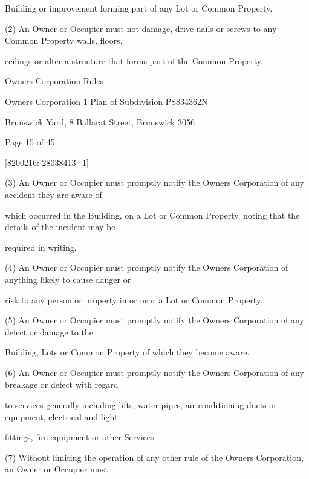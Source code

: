 \documentclass{article}
\begin{document}
{\fontsize{10.02}{1}Building or improvement forming part of any Lot or Common Property. }

{\fontsize{9.962}{1}(2) An Owner or Occupier must not damage, drive nails or screws to any Common Property walls, floors, }

{\fontsize{10.02}{1}ceilings or alter a structure that forms part of the Common Property. }


\newpage





{\fontsize{9}{1}Owners Corporation Rules }

{\fontsize{9}{1}Owners Corporation 1 Plan of Subdivision PS834362N }

{\fontsize{9}{1}Brunswick Yard, 8 Ballarat Street, Brunswick 3056 }


{\fontsize{9}{1}Page 15  of 45 }



{\fontsize{7.02}{1}[8200216: 28038413\_1] }

{\fontsize{9.962}{1}(3) An Owner or Occupier must promptly notify the Owners Corporation of any accident they are aware of }

{\fontsize{10.02}{1}which occurred in the Building, on a Lot or Common Property, noting that the details of the incident may be }

{\fontsize{10.02}{1}required in writing. }

{\fontsize{9.962}{1}(4) An Owner or Occupier must promptly notify the Owners Corporation of anything likely to cause danger or }

{\fontsize{10.02}{1}risk to any person or property in or near a Lot or Common Property. }

{\fontsize{9.962}{1}(5) An Owner or Occupier must promptly notify the Owners Corporation of any defect or damage to the }

{\fontsize{10.02}{1}Building, Lots or Common Property of which they become aware. }

{\fontsize{9.962}{1}(6) An Owner or Occupier must promptly notify the Owners Corporation of any breakage or defect with regard }

{\fontsize{10.02}{1}to services generally including lifts, water pipes, air conditioning ducts or equipment, electrical and light }

{\fontsize{10.02}{1}fittings, fire equipment or other Services. }

{\fontsize{9.962}{1}(7) Without limiting the operation of any other rule of the Owners Corporation, an Owner or Occupier must }
\end{document}
